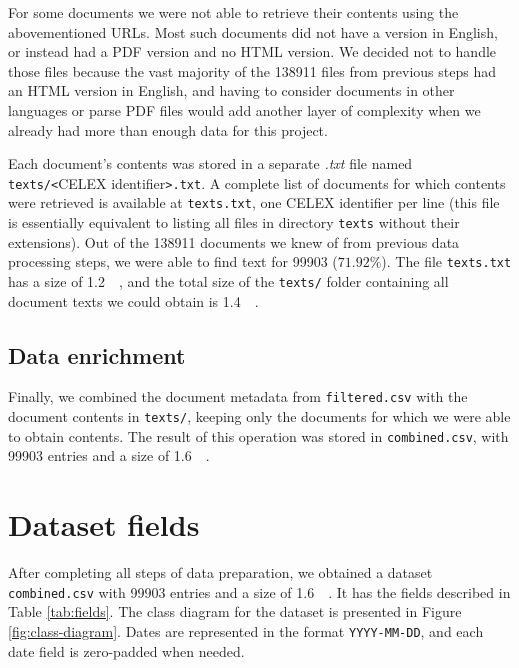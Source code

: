 \documentclass[sigconf, authorversion]{acmart}
\begin{document}
For some documents we were not able to retrieve their contents using the abovementioned URLs. Most such documents did not have a version in English, or instead had a PDF version and no  HTML version. We decided not to handle those files because the vast majority of the 138911 files from previous steps had an HTML version in English, and having to consider documents in other languages or parse PDF files would add another layer of complexity when we already had more than enough data for this project.

Each document's contents was stored in a separate \textit{.txt} file named \texttt{texts/<}CELEX identifier\texttt{>.txt}. A complete list of documents for which contents were retrieved is available at \texttt{texts.txt}, one CELEX identifier per line (this file is essentially equivalent to listing all files in directory \texttt{texts} without their extensions). Out of the 138911 documents we knew of from previous data processing steps, we were able to find text for 99903 ($71.92\%$). The file \texttt{texts.txt} has a size of \SI{1.2}{\mega\byte}, and the total size of the \texttt{texts/} folder containing all document texts we could obtain is \SI{1.4}{\giga\byte}.

\subsection{Data enrichment}

Finally, we combined the document metadata from \texttt{filtered.csv} with the document contents in \texttt{texts/}, keeping only the documents for which we were able to obtain contents. The result of this operation was stored in \texttt{combined.csv}, with 99903 entries and a size of \SI{1.6}{\giga\byte}.

\section{Dataset fields}
\label{sec:dataset-fields}

After completing all steps of data preparation, we obtained a dataset \texttt{combined.csv} with 99903 entries and a size of \SI{1.6}{\giga\byte}. It has the fields described in Table \ref{tab:fields}.
The class diagram for the dataset is presented in Figure \ref{fig:class-diagram}.
Dates are represented in the format \texttt{YYYY-MM-DD}, and each date field is zero-padded when needed.
\end{document}
